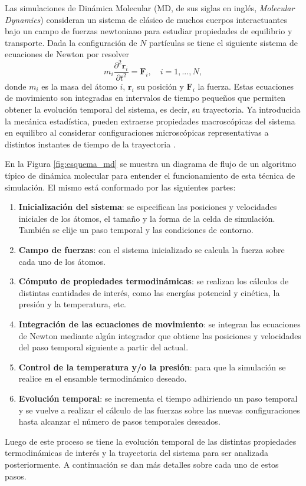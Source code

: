 Las simulaciones de Dinámica Molecular (MD, de sus siglas en inglés, 
\textit{Molecular Dynamics}) consideran un sistema de clásico de muchos cuerpos 
interactuantes bajo un campo de fuerzas newtoniano para estudiar propiedades de 
equilibrio y transporte. Dada la configuración de $N$ partículas se tiene el 
siguiente sistema de ecuaciones de Newton por resolver
\begin{equation}
    m_i \frac{\partial^2 \mathbf{r}_i}{\partial t^2} = \mathbf{F}_i, \quad i = 1,..., N,
\end{equation}
donde $m_i$ es la masa del átomo $i$, $\mathbf{r}_i$ su posición y $\mathbf{F}_i$
la fuerza. Estas ecuaciones de movimiento son integradas en intervalos de tiempo
pequeños que permiten obtener la evolución temporal del sistema, es decir, su
trayectoria. Ya introducida la mecánica estadística, pueden extraerse propiedades
macroscópicas del sistema en equilibro al considerar configuraciones microscópicas
representativas a distintos instantes de tiempo de la trayectoria
\cite{allen2017, frenkel2001}.

En la Figura \ref{fig:esquema_md} se muestra un diagrama de flujo de un algoritmo
típico de dinámica molecular para entender el funcionamiento de esta técnica de 
simulación. El mismo está conformado por las siguientes partes:
\begin{enumerate}
    \item \textbf{Inicialización del sistema}: se especifican las posiciones y
        velocidades iniciales de los átomos, el tamaño y la forma de la celda de 
        simulación. También se elije un paso temporal y las condiciones de 
        contorno.
    \item \textbf{Campo de fuerzas}: con el sistema inicializado se calcula la 
        fuerza sobre cada uno de los átomos.
    \item \textbf{Cómputo de propiedades termodinámicas}: se realizan los
        cálculos de distintas cantidades de interés, como las energías potencial
        y cinética, la presión y la temperatura, etc.
    \item \textbf{Integración de las ecuaciones de movimiento}: se integran las
        ecuaciones de Newton mediante algún integrador que obtiene las posiciones
        y velocidades del paso temporal siguiente a partir del actual.
    \item \textbf{Control de la temperatura y/o la presión}: para que la 
        simulación se realice en el ensamble termodinámico deseado.
    \item \textbf{Evolución temporal}: se incrementa el tiempo adhiriendo un
        paso temporal y se vuelve a realizar el cálculo de las fuerzas sobre las 
        nuevas configuraciones hasta alcanzar el número de pasos temporales 
        deseados.
\end{enumerate}
Luego de este proceso se tiene la evolución temporal de las distintas propiedades
termodinámicas de interés y la trayectoria del sistema para ser analizada 
posteriormente. A continuación se dan más detalles sobre cada uno de estos pasos.

